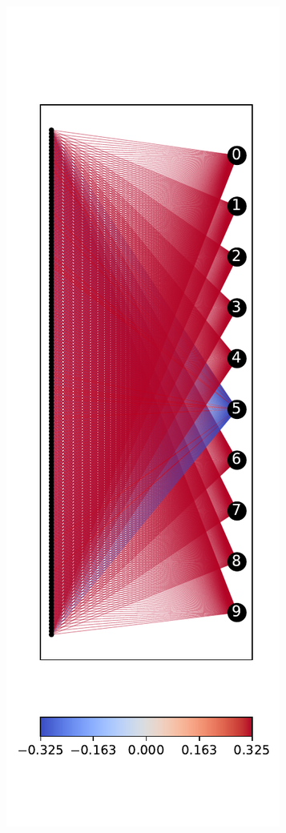 \documentclass[a4paper]{llncs}
\begin{document}
\begin{figure}[h!]
  \centering
  \begin{subfigure}{0.4\linewidth}
    \includegraphics[width=\linewidth]{../data/results/problem3/last_layer_1_wm_example.pdf}

\end{subfigure}
\end{figure}
\end{document}
